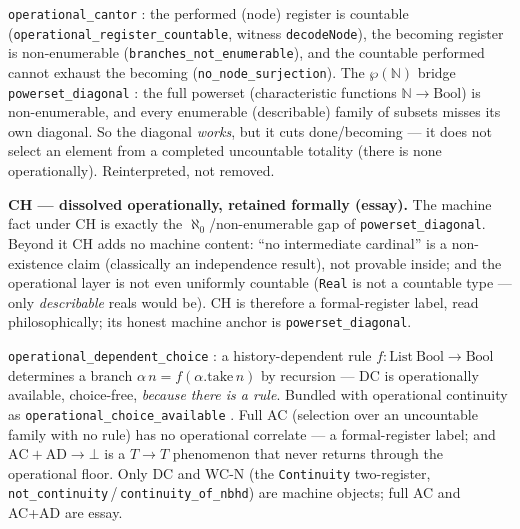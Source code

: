 \begin{theorem}
\label{thm:continuum_cantor}
\leanok
{}
\texttt{operational\_cantor} \axiomprofile{[]}: the performed (node)
register is countable (\texttt{operational\_register\_countable}, witness \texttt{decodeNode}),
the becoming register is non-enumerable (\texttt{branches\_not\_enumerable}), and the countable
performed cannot exhaust the becoming (\texttt{no\_node\_surjection}).  The $\wp(\mathbb{N})$
bridge \texttt{powerset\_diagonal} \axiomprofile{[]}: the full powerset (characteristic
functions $\mathbb{N}\to\mathrm{Bool}$) is non-enumerable, and every enumerable (describable)
family of subsets misses its own diagonal.  So the diagonal \emph{works}, but it cuts
done/becoming --- it does not select an element from a completed uncountable totality (there
is none operationally).  Reinterpreted, not removed.
\end{theorem}

\textbf{CH --- dissolved operationally, retained formally (essay).}  The machine fact under CH
is exactly the $\aleph_0$/non-enumerable gap of \texttt{powerset\_diagonal}.  Beyond it CH adds
no machine content: ``no intermediate cardinal'' is a non-existence claim (classically an
independence result), not provable inside; and the operational layer is not even uniformly
countable (\texttt{Real} is not a countable type --- only \emph{describable} reals would be).
CH is therefore a formal-register label, read philosophically; its honest machine anchor is
\texttt{powerset\_diagonal}.

\begin{theorem}
\label{thm:continuum_dc}
\leanok
\texttt{operational\_dependent\_choice} \axiomprofile{[]}: a history-dependent rule
$f:\mathrm{List\ Bool}\to\mathrm{Bool}$ determines a branch $\alpha\,n = f(\alpha.\mathrm{take}\,n)$
by recursion --- DC is operationally available, choice-free, \emph{because there is a rule}.
Bundled with operational continuity as \texttt{operational\_choice\_available}
\axiomprofile{[]}.  Full AC (selection over an uncountable family with no
rule) has no operational correlate --- a formal-register label; and
$\mathrm{AC}+\mathrm{AD}\to\bot$ is a $T\!\to\!T$ phenomenon that never returns through the
operational floor.  Only DC and WC-N (the \texttt{Continuity} two-register,
\texttt{not\_continuity}\,/\,\texttt{continuity\_of\_nbhd}) are machine objects; full AC and
AC+AD are essay.
\end{theorem}

